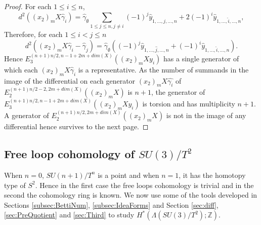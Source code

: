 \documentclass{article}
\theoremstyle{plain}
\theoremstyle{definition}
\numberwithin{thm}{section}
\begin{document}
\begin{proof}
				For each $1\leq i \leq n$,
				\begin{equation*}
					d^2((x_2)_mX\hat{\gamma}_i)=
					\hat{\gamma}_{\emptyset}\sum_{1\leq j\leq n, j\neq i}{(-1)^j\hat{y}_{1,\dots,\hat{j},\dots,n}+2(-1)^i\hat{y}_{1,\dots,\hat{i},\dots,n}},
				\end{equation*}
				Therefore, for each $1\leq i <j \leq n$
				\begin{equation*}
					d^2((x_2)_mX{\hat{\gamma}_i-\hat{\gamma}_j})
					=\hat{\gamma}_{\emptyset}((-1)^j\hat{y}_{1,\dots,\hat{j},\dots,n}+(-1)^i\hat{y}_{1,\dots,\hat{i},\dots,n}).
				\end{equation*}
				Hence $E_3^{(n+1)n/2,n-1+2m+dim(X)}((x_2)_mXy_i)$ has a single generator of which each $(x_2)_mX{\hat{\gamma}_i}$ is a representative.
				As the number of summands in the image of the differential on each generator $(x_2)_mX\hat{\gamma_i}$ of $E_2^{(n+1)n/2-2,2m+dim(X)}((x_2)_mX)$
				is $n+1$, the generator of $E_3^{(n+1)n/2,n-1+2m+dim(X)}((x_2)_mXy_i)$ is torsion and has multiplicity $n+1$.
				A generator of $E_2^{(n+1)n/2,2m+dim(X)}((x_2)_mX)$ is not in the image of any differential hence survives to the next page.
			\end{proof}	

		
		\subsection{Free loop cohomology of $SU(3)/T^2$}\label{sec:L(SU(3)/T^2)}
		
			When $n=0$, $SU(n+1)/T^n$ is a point and when $n=1$, it has the homotopy type of $S^2$.
			Hence in the first case the free loops cohomology is trivial and in the second the cohomology ring is known.
			We now use some of the tools developed in Sections \ref{subsec:BettiNum}, \ref{subsec:IdeaForms}
			and Section \ref{sec:diff}, \ref{sec:PreQuotient} and \ref{sec:Third}
			to study $H^*(\Lambda(SU(3)/T^{2});\mathbb{Z})$.
			
\end{document}
